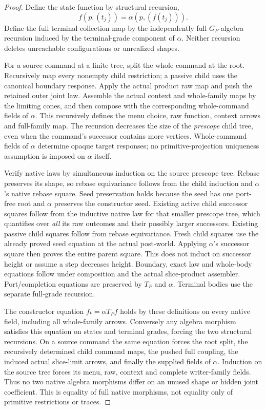 \documentclass[11pt]{article}
\begin{document}
\begin{proof}
Define the state function by structural recursion,
\[
f(p,(t_j))=\alpha(p,(f(t_j))).
\]
Define the full terminal collection map by the independently full $G_P$-algebra recursion induced by the terminal-grade component of $\alpha$. Neither recursion deletes unreachable configurations or unrealized shapes.

For a source command at a finite tree, split the whole command at the root. Recursively map every nonempty child restriction; a passive child uses the canonical boundary response. Apply the actual product raw map and push the retained outer joint law. Assemble the actual context and whole-family maps by the limiting cones, and then compose with the corresponding whole-command fields of $\alpha$. This recursively defines the menu choice, raw function, context arrows and full-family map. The recursion decreases the size of the \emph{prescope} child tree, even when the command's successor contains more vertices. Whole-command fields of $\alpha$ determine opaque target responses; no primitive-projection uniqueness assumption is imposed on $\alpha$ itself.

Verify native laws by simultaneous induction on the source prescope tree. Rebase preserves its shape, so rebase equivariance follows from the child induction and $\alpha$'s native rebase square. Seed preservation holds because the seed has one port-free root and $\alpha$ preserves the constructor seed. Existing active child successor squares follow from the inductive native law for that smaller prescope tree, which quantifies over \emph{all} its raw outcomes and their possibly larger successors. Existing passive child squares follow from rebase equivariance. Fresh child squares use the already proved seed equation at the actual post-world. Applying $\alpha$'s successor square then proves the entire parent square. This does not induct on successor height or assume a step decreases height. Boundary, exact law and whole-body equations follow under composition and the actual slice-product assembler. Port/completion equations are preserved by $T_P$ and $\alpha$. Terminal bodies use the separate full-grade recursion.

The constructor equation $f\iota=\alpha T_Pf$ holds by these definitions on every native field, including all whole-family arrows. Conversely any algebra morphism satisfies this equation on states and terminal grades, forcing the two structural recursions. On a source command the same equation forces the root split, the recursively determined child command maps, the pushed full coupling, the induced actual slice-limit arrows, and finally the supplied fields of $\alpha$. Induction on the source tree forces its menu, raw, context and complete writer-family fields. Thus no two native algebra morphisms differ on an unused shape or hidden joint coefficient. This is equality of full native morphisms, not equality only of primitive restrictions or traces.
\end{proof}
\end{document}
